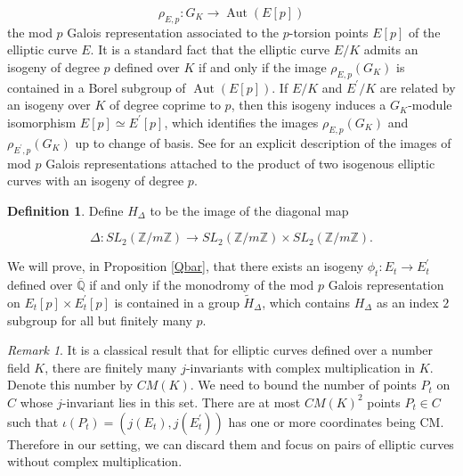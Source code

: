 \documentclass[12pt]{amsart}
\theoremstyle{definition}
\newtheorem{defn}[thm]{Definition}
\theoremstyle{remark}
\newtheorem{remark}[thm]{Remark}
\numberwithin{equation}{section}
\newcommand{\Z}{\mathbb{Z}}
\newcommand{\Q}{\mathbb{Q}}
\newcommand{\Aut}{\operatorname{Aut}}
\begin{document}
$$\rho_{E,p}: G_{K} \to \Aut(E[p])$$
the mod $p$ Galois representation associated to the $p$-torsion points $E[p]$ of the elliptic curve $E$. It is a standard fact that the elliptic curve $E/ K$ admits an isogeny of degree $p$ defined over $K$ if and only if the image $\rho_{E, p}\left(G_{K}\right)$ is contained in a Borel subgroup of $\Aut(E[p])$. If $E/ K$ and $E^{\prime} / K$ are related by an isogeny over $K$ of degree coprime to $p$, then this isogeny induces a $G_{K}$-module isomorphism $E[p] \simeq E^{\prime}[p]$, which identifies the images $\rho_{E, p}\left(G_{K}\right)$ and $\rho_{E^{\prime}, p}(G_{K})$ up to change of basis. See \cite{RV00} for an explicit description of the images of mod $p$ Galois representations attached to the product of two isogenous elliptic curves with an isogeny of degree $p$. 

\begin{defn}\label{Hdelta}
	Define $H_{\Delta}$ to be the image of the diagonal map 
	
	$$\Delta: SL_{2}(\Z/m\Z) \to SL_{2}(\Z/m\Z) \times SL_{2}(\Z/m\Z).$$
\end{defn}

We will prove, in Proposition \ref{Qbar}, that there exists an isogeny $\phi_{t}: E_{t} \to E^{\prime}_{t}$ defined over $\overline{\Q}$ if and only if the monodromy of the mod $p$ Galois representation on $E_{t}[p] \times E^{\prime}_{t}[p]$ is contained in a group $\tilde{H}_{\Delta}$, which contains $H_{\Delta}$ as an index $2$ subgroup for all but finitely many $p$.  

 \vspace{1em}
\begin{remark}
  It is a classical result that for elliptic curves defined over a number field $K$, there are finitely many $j$-invariants with complex multiplication in $K$. Denote this number by $CM(K)$. We need to bound the number of points $P_t$ on $C$ whose $j$-invariant lies in this set. There are at most $CM(K)^{2}$ points $P_{t} \in C$ such that $\iota(P_t)=(j(E_t), j(E^{\prime}_t))$ has one or more coordinates being CM. Therefore in our setting, we can discard them and focus on pairs of elliptic curves without complex multiplication.
  \end{remark}
\end{document}
